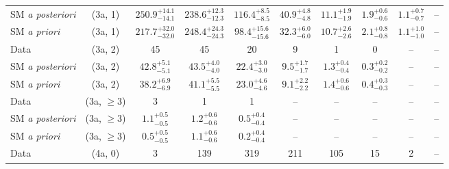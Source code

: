 \begin{table}[h!]
{\begin{tabular}{lccccccccc}
	SM {\it a posteriori} & (3a, 1)           & $250.9^{+ 14.1 }_{- 14.1 }$    & $238.6^{+ 12.3 }_{- 12.3 }$    & $116.4^{+ 8.5 }_{- 8.5 }$   & $40.9^{+ 4.8 }_{- 4.8 }$    & $11.1^{+ 1.9 }_{- 1.9 }$    & $1.9^{+ 0.6 }_{- 0.6 }$  & $1.1^{+ 0.7 }_{- 0.7 }$  & --           \\[0.5ex] 
	SM {\it a priori}     & (3a, 1)           & $217.7^{+ 32.0 }_{- 32.0 }$    & $248.4^{+ 24.3 }_{- 24.3 }$    & $98.4^{+ 15.6 }_{- 15.6 }$  & $32.3^{+ 6.0 }_{- 6.0 }$    & $10.7^{+ 2.6 }_{- 2.6 }$    & $2.1^{+ 0.8 }_{- 0.8 }$  & $1.1^{+ 1.0 }_{- 1.0 }$  & --           \\[0.5ex] 
	Data                  & (3a, 2)           & 45                             & 45                             & 20                          & 9                           & 1                           & 0                        & --                       & --           \\[0.5ex] 
	SM {\it a posteriori} & (3a, 2)           & $42.8^{+ 5.1 }_{- 5.1 }$       & $43.5^{+ 4.0 }_{- 4.0 }$       & $22.4^{+ 3.0 }_{- 3.0 }$    & $9.5^{+ 1.7 }_{- 1.7 }$     & $1.3^{+ 0.4 }_{- 0.4 }$     & $0.3^{+ 0.2 }_{- 0.2 }$  & --                       & --           \\[0.5ex] 
	SM {\it a priori}     & (3a, 2)           & $38.2^{+ 6.9 }_{- 6.9 }$       & $41.1^{+ 5.5 }_{- 5.5 }$       & $23.0^{+ 4.6 }_{- 4.6 }$    & $9.1^{+ 2.2 }_{- 2.2 }$     & $1.4^{+ 0.6 }_{- 0.6 }$     & $0.4^{+ 0.3 }_{- 0.3 }$  & --                       & --           \\[0.5ex] 
	Data                  & (3a, $\ge3$)      & 3                              & 1                              & 1                           & --                          & --                          & --                       & --                       & --           \\[0.5ex] 
	SM {\it a posteriori} & (3a, $\ge3$)      & $1.1^{+ 0.5 }_{- 0.5 }$        & $1.2^{+ 0.6 }_{- 0.6 }$        & $0.5^{+ 0.4 }_{- 0.4 }$     & --                          & --                          & --                       & --                       & --           \\[0.5ex] 
	SM {\it a priori}     & (3a, $\ge3$)      & $0.5^{+ 0.5 }_{- 0.5 }$        & $1.1^{+ 0.6 }_{- 0.6 }$        & $0.2^{+ 0.4 }_{- 0.4 }$     & --                          & --                          & --                       & --                       & --           \\[0.5ex] 
	Data                  & (4a, 0)           & 3                              & 139                            & 319                         & 211                         & 105                         & 15                       & 2                        & --           \\[0.5ex] 

\end{tabular}}
\end{table}
